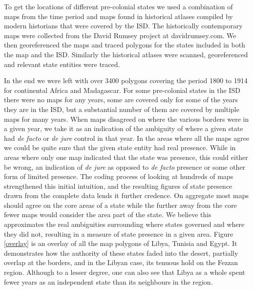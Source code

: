 \documentclass[12pt]{article}
\begin{document}
\begin{multicols}{2}

To get the locations of different pre-colonial states we used a combination of
maps from the time period and maps found in historical atlases compiled by
modern historians that were covered by the ISD. The historically contemporary
maps were collected from the David Rumsey project at davidrumsey.com. We then
georeferenced the maps and traced polygons for the states included in both the
map and the ISD. Similarly the historical atlases were scanned, georeferenced
and relevant state entities were traced.

In the end we were left with over 3400 polygons covering the period 1800 to 1914
for continental Africa and Madagascar. For some pre-colonial states in the ISD
there were no maps for any years, some are covered only for some of the years
they are in the ISD, but a substantial number of them are covered by multiple
maps for many years. When maps disagreed on where the various borders were in a
given year, we take it as an indication of the ambiguity of where a given state
had \emph{de facto} or \emph{de jure} control in that year. In the areas where
all the maps agree we could be quite sure that the given state entity had real
presence.  While in areas where only one map indicated that the state was
presence, this could either be wrong, an indication of \emph{de jure} as opposed
to \emph{de facto} presence or some other form of limited presence. The coding
process of looking at hundreds of maps strengthened this initial intuition, and
the resulting figures of state presence drawn from the complete data lends it
further credence. On aggregate most maps should agree on the core areas of a
state while the further away from the core fewer maps would consider the area
part of the state. We believe this approximates the real ambiguities surrounding
where states governed and where they did not, resulting in a measure of state
presence in a given area. Figure \ref{overlay} is an overlay of all the map
polygons of Libya, Tunisia and Egypt. It demonstrates how the authority of these
states faded into the desert, partially overlap at the borders, and in the
Libyan case, its tenuous hold on the Fezzan region. Although to a lesser degree,
one can also see that Libya as a whole spent fewer years as an independent state
than its neighbours in the region.

\end{multicols}
\end{document}
